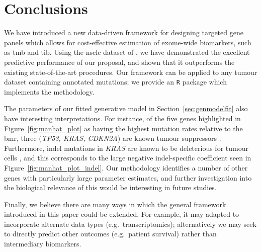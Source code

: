 \documentclass[12pt]{article}
\begin{document}



\section{Conclusions \label{sec:conclusion}}

 We have introduced a new data-driven framework for designing targeted gene panels which allows for cost-effective estimation of exome-wide biomarkers, such as \acrlong{tmb} and \acrlong{tib}.  Using the \acrshort{nsclc} dataset of \citet{campbell_distinct_2016}, we have demonstrated the excellent predictive performance of our proposal, and shown that it outperforms the existing state-of-the-art procedures. Our framework can be applied to any tumour dataset containing annotated mutations; we provide an \texttt{R} package \citep{BradleyCannings_2020} which implements the methodology.
 
The parameters of our fitted generative model in Section~\ref{sec:genmodelfit} also have interesting interpretations. For instance, of the five genes highlighted in Figure~\ref{fig:manhat_plot} as having the highest mutation rates relative to the \acrshort{bmr}, three (\textit{TP53, KRAS, CDKN2A}) are known tumour suppressors \citep{olivier_tp53_2010, jancik_clinical_2010, foulkes_cdkn2a_1997}.  Furthermore, indel mutations in \textit{KRAS} are known to be deleterious for tumour cells \citep{lee_selective_2018}, and this corresponds to the large negative indel-specific coefficient seen in Figure~\ref{fig:manhat_plot_indel}.  Our methodology identifies a number of other genes with particularly large parameter estimates, and further investigation into the biological relevance of this would be interesting in future studies.  

Finally, we believe there are many ways in which the general framework introduced in this paper could be extended. For example, it may adapted to incorporate alternate data types (e.g.~transcriptomics); alternatively we may seek to directly predict other outcomes (e.g.~patient survival) rather than intermediary biomarkers. 
\end{document}
